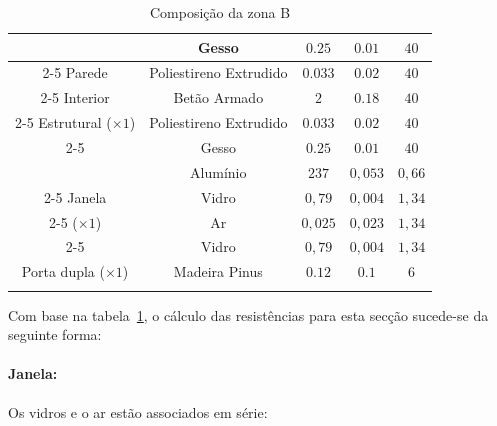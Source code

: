 \documentclass[12pt, a4paper]{article}
\begin{document}
\begin{table}[htpb]
\begin{center}
\begin{tabular}{c c c c c}
			\multirow{5}{*}{}          & Gesso                  & $0.25$                            & $0.01$                       & $40$          \\
				\cline{2-5}
			Parede                     & Poliestireno Extrudido & $0.033$                           & $0.02$                       & $40$          \\
				\cline{2-5}
			Interior                   & Betão Armado           & $2$                               & $0.18$                       & $40$          \\
				\cline{2-5}
			Estrutural ($\times 1$)    & Poliestireno Extrudido & $0.033$                           & $0.02$                       & $40$          \\
				\cline{2-5}
			                           & Gesso                  & $0.25$                            & $0.01$                       & $40$          \\
				\midrule{}

			\multirow{5}{*}{}		   & Alumínio 				& $237$                            	& $0,053$                      & $0,66$		   \\
				\cline{2-5}
			Janela    				   & Vidro    				& $0,79$                           	& $0,004$                      & $1,34$		   \\
				\cline{2-5}
			($\times 1$)			   & Ar       				& $0,025$                          	& $0,023$                      & $1,34$		   \\
				\cline{2-5}
									   & Vidro    				& $0,79$                           	& $0,004$                      & $1,34$		   \\
				\midrule{}
			Porta dupla ($\times 1$)   & Madeira Pinus          & $0.12$                            & $0.1$                        & $6$           \\
			\bottomrule{}
		\end{tabular}
	\end{center}
	\caption{Composição da zona B}\label{tab:zona_b}
\end{table}

Com base na tabela~\ref*{tab:zona_b}, o cálculo das resistências para esta secção sucede-se da seguinte forma:

\paragraph{Janela:}\label{par:zona_b_janela}Os vidros e o ar estão associados em série:
\end{document}
